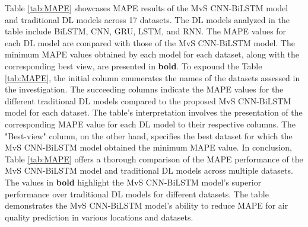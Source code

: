 \documentclass[a4paper,fleqn]{cas-dc}
\begin{document}
Table \ref{tab:MAPE} showcases MAPE results of the MvS CNN-BiLSTM model and traditional DL models across 17 datasets. The DL models analyzed in the table include BiLSTM, CNN, GRU, LSTM, and RNN. The MAPE values for each DL model are compared with those of the MvS CNN-BiLSTM model. The minimum MAPE values obtained by each model for each dataset, along with the corresponding best view, are presented in \textbf{bold}. To expound the Table \ref{tab:MAPE}, the initial column enumerates the names of the datasets assessed in the investigation. The succeeding columns indicate the MAPE values for the different traditional DL models compared to the proposed MvS CNN-BiLSTM model for each dataset. The table's interpretation involves the presentation of the corresponding MAPE value for each DL model to their respective columns. The "Best-view" column, on the other hand, specifies the best dataset for which the MvS CNN-BiLSTM model obtained the minimum MAPE value. In conclusion, Table \ref{tab:MAPE} offers a thorough comparison of the MAPE performance of the MvS CNN-BiLSTM model and traditional DL models across multiple datasets. The values in \textbf{bold} highlight the MvS CNN-BiLSTM model's superior performance over traditional DL models for different datasets. The table demonstrates the MvS CNN-BiLSTM model's ability to reduce MAPE for air quality prediction in various locations and datasets.
\end{document}
